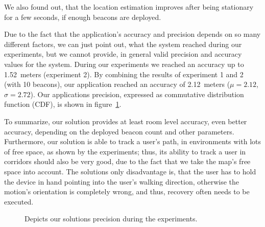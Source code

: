 We also found out, that the location estimation improves after being stationary for a few seconds, if enough beacons are deployed.

Due to the fact that the application's accuracy and precision depends on so many different factors, we can just point out, what the system reached during our experiments, but we cannot provide, in general valid precision and accuracy values for the system. During our experiments we reached an accuracy up to 1.52~meters (experiment 2). By combining the results of experiment 1 and 2 (with 10 beacons), our application reached an accuracy of 2.12~meters ($\mu=2.12$, $\sigma=2.72$). Our applications precision, expressed as commutative distribution function (CDF), is shown in figure~\ref{fig:eval:precision}.

To summarize, our solution provides at least room level accuracy, even better accuracy, depending on the deployed beacon count and other parameters. Furthermore, our solution is able to track a user's path, in environments with lots of free space, as shown by the experiments; thus, its ability to track a user in corridors should also be very good, due to the fact that we take the map's free space into account. The solutions only disadvantage is, that the user has to hold the device in hand pointing into the user's walking direction, otherwise the motion's orientation is completely wrong, and thus, recovery often needs to be executed.



\begin{figure}
\caption{Depicts our solutions precision during the experiments.}
\label{fig:eval:precision}
\end{figure}



